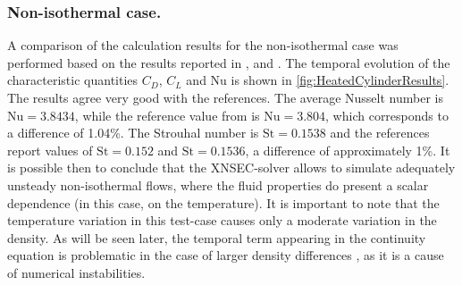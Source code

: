 \subsubsection{Non-isothermal case.}
A comparison of the calculation results for the non-isothermal case was performed based on the results reported in \cite{shiHeatingEffectSteady2004}, \cite{wangRelationshipEffectiveReynolds2000} and \cite{henninkLowMachNumberFlow2022}.
The temporal evolution of the characteristic quantities $C_D$, $C_L$ and Nu is shown in \cref{fig:HeatedCylinderResults}. The results agree very good with the references. The average Nusselt number is  $\text{Nu} = 3.8434$, while the reference value from \cite{henninkLowMachNumberFlow2022} is $\text{Nu} = 3.804$, which corresponds to a difference of 1.04\%. The Strouhal number is $\text{St} = 0.1538$ and the references report values of $\text{St} = 0.152$ and $\text{St} = 0.1536$, a difference of approximately 1\%. It is possible then to conclude that the XNSEC-solver allows to simulate adequately unsteady non-isothermal flows, where the fluid properties do present a scalar dependence (in this case, on the temperature). It is important to note that the temperature variation in this test-case causes only a moderate variation in the density. As will be seen later, the temporal term appearing in the continuity equation is problematic in the case of larger density differences \citep{knikkerComparativeStudyHighorder2011}, as it is a cause of numerical instabilities.




\FloatBarrier